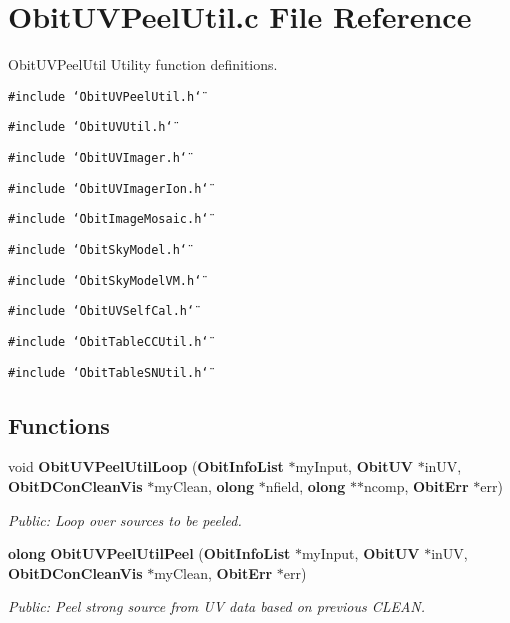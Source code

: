 \section{Obit\-UVPeel\-Util.c File Reference}
\label{ObitUVPeelUtil_8c}
Obit\-UVPeel\-Util Utility function definitions. 

{\tt \#include \char`\"{}Obit\-UVPeel\-Util.h\char`\"{}}\par
{\tt \#include \char`\"{}Obit\-UVUtil.h\char`\"{}}\par
{\tt \#include \char`\"{}Obit\-UVImager.h\char`\"{}}\par
{\tt \#include \char`\"{}Obit\-UVImager\-Ion.h\char`\"{}}\par
{\tt \#include \char`\"{}Obit\-Image\-Mosaic.h\char`\"{}}\par
{\tt \#include \char`\"{}Obit\-Sky\-Model.h\char`\"{}}\par
{\tt \#include \char`\"{}Obit\-Sky\-Model\-VM.h\char`\"{}}\par
{\tt \#include \char`\"{}Obit\-UVSelf\-Cal.h\char`\"{}}\par
{\tt \#include \char`\"{}Obit\-Table\-CCUtil.h\char`\"{}}\par
{\tt \#include \char`\"{}Obit\-Table\-SNUtil.h\char`\"{}}\par
\subsection*{Functions}
\begin{CompactItemize}
\item 
void {\bf Obit\-UVPeel\-Util\-Loop} ({\bf Obit\-Info\-List} $\ast$my\-Input, {\bf Obit\-UV} $\ast$in\-UV, {\bf Obit\-DCon\-Clean\-Vis} $\ast$my\-Clean, {\bf olong} $\ast$nfield, {\bf olong} $\ast$$\ast$ncomp, {\bf Obit\-Err} $\ast$err)
\begin{CompactList}\small\item\em Public: Loop over sources to be peeled. \item\end{CompactList}\item 
{\bf olong} {\bf Obit\-UVPeel\-Util\-Peel} ({\bf Obit\-Info\-List} $\ast$my\-Input, {\bf Obit\-UV} $\ast$in\-UV, {\bf Obit\-DCon\-Clean\-Vis} $\ast$my\-Clean, {\bf Obit\-Err} $\ast$err)
\begin{CompactList}\small\item\em Public: Peel strong source from UV data based on previous CLEAN. \item\end{CompactList}\end{CompactItemize}


